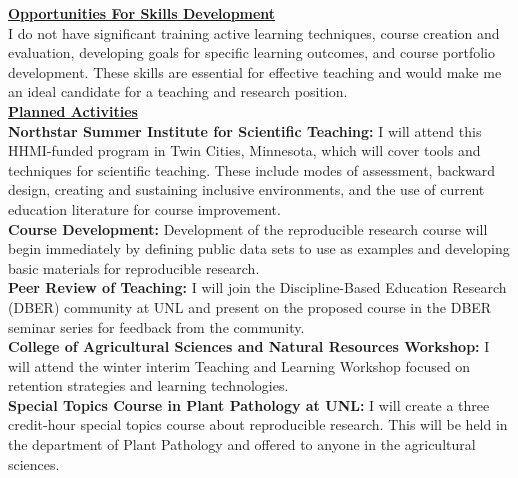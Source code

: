 \documentclass[12pt,letterpaper]{article}
\begin{document}


\noindent \textbf{\underline{Opportunities For Skills Development}}\\
I do not have significant training active learning techniques, course creation and evaluation, developing goals for specific learning outcomes, and course portfolio development. 
These skills are essential for effective teaching and would make me an ideal candidate for a teaching and research position.\\

\noindent \textbf{\underline{Planned Activities}}\\
\noindent \textbf{Northstar Summer Institute for Scientific Teaching:} I will attend this HHMI-funded program in Twin Cities, Minnesota, which will cover tools and techniques for scientific teaching. These include modes of assessment, backward design, creating and sustaining inclusive environments, and the use of current education literature for course improvement.\\
\noindent \textbf{Course Development:} Development of the reproducible research course will begin immediately by defining public data sets to use as examples and developing basic materials for reproducible research.\\
\noindent \textbf{Peer Review of Teaching:} I will join the Discipline-Based Education Research (DBER) community at UNL and present on the proposed course in the DBER seminar series for feedback from the community.\\
\noindent \textbf{College of Agricultural Sciences and Natural Resources Workshop:} I will attend the winter interim Teaching and Learning Workshop focused on retention strategies and learning technologies.\\
\noindent \textbf{Special Topics Course in Plant Pathology at UNL:} I will create a three credit-hour special topics course about reproducible research. This will be held in the department of Plant Pathology and offered to anyone in the agricultural sciences. \\
\end{document}
